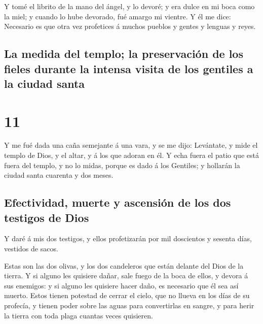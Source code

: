  Y tomé el librito de la mano del ángel, y lo devoré; y
era dulce en mi boca como la miel; y cuando lo hube devorado, fué amargo
mi vientre.  Y él me dice: Necesario es que otra vez
profetices á muchos pueblos y gentes y lenguas y reyes.

\hypertarget{la-medida-del-templo-la-preservaciuxf3n-de-los-fieles-durante-la-intensa-visita-de-los-gentiles-a-la-ciudad-santa}{%
\subsection{La medida del templo; la preservación de los fieles durante
la intensa visita de los gentiles a la ciudad
santa}\label{la-medida-del-templo-la-preservaciuxf3n-de-los-fieles-durante-la-intensa-visita-de-los-gentiles-a-la-ciudad-santa}}

\hypertarget{section-10}{%
\section{11}\label{section-10}}

 Y me fué dada una caña semejante á una vara, y se me
dijo: Levántate, y mide el templo de Dios, y el altar, y á los que
adoran en él.  Y echa fuera el patio que está fuera del
templo, y no lo midas, porque es dado á los Gentiles; y hollarán la
ciudad santa cuarenta y dos meses.

\hypertarget{efectividad-muerte-y-ascensiuxf3n-de-los-dos-testigos-de-dios}{%
\subsection{Efectividad, muerte y ascensión de los dos testigos de
Dios}\label{efectividad-muerte-y-ascensiuxf3n-de-los-dos-testigos-de-dios}}

 Y daré á mis dos testigos, y ellos profetizarán por mil
doscientos y sesenta días, vestidos de sacos.

 Estas son las dos olivas, y los dos candeleros que están
delante del Dios de la tierra.  Y si alguno les quisiere
dañar, sale fuego de la boca de ellos, y devora á sus enemigos: y si
alguno les quisiere hacer daño, es necesario que él sea así muerto.
 Estos tienen potestad de cerrar el cielo, que no llueva
en los días de su profecía, y tienen poder sobre las aguas para
convertirlas en sangre, y para herir la tierra con toda plaga cuantas
veces quisieren.


